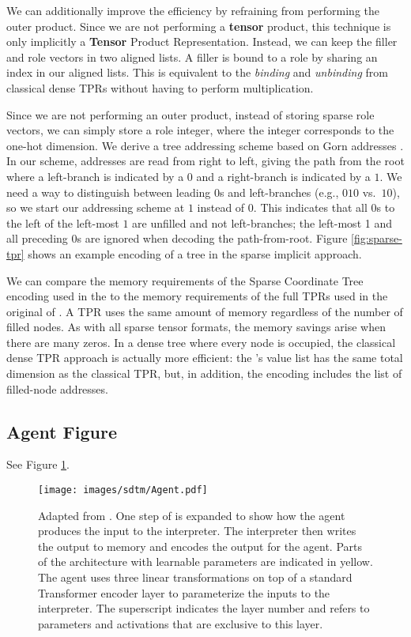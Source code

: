 We can additionally improve the efficiency by refraining from performing the outer product. Since we are not performing a \textbf{tensor} product, this technique is only implicitly a \textbf{Tensor} Product Representation. Instead, we can keep the filler and role vectors in two aligned lists. A filler is bound to a role by sharing an index in our aligned lists. This is equivalent to the \textit{binding} and \textit{unbinding} from classical dense TPRs without having to perform multiplication.

Since we are not performing an outer product, instead of storing sparse role vectors, we can simply store a role integer, where the integer corresponds to the one-hot dimension. We derive a tree addressing scheme based on Gorn addresses \citep{gorn+1967+77+115}. In our scheme, addresses are read from right to left, giving the path from the root where a left-branch is indicated by a $0$ and a right-branch is indicated by a $1$. We need a way to distinguish between leading $0$s and left-branches (e.g., $010$ vs.\ $10$), so we start our addressing scheme at $1$ instead of $0$. This indicates that all $0$s to the left of the left-most $1$ are unfilled and not left-branches; the left-most 1 and all preceding 0s are ignored when decoding the path-from-root. Figure \ref{fig:sparse-tpr} shows an example encoding of a tree in the sparse implicit approach.

We can compare the memory requirements of the Sparse Coordinate Tree encoding used in the \sdtm to the memory requirements of the full TPRs used in the original \dtm of \citet{Soulos_2023_DifferentiableTreeOperations}. A TPR uses the same amount of memory regardless of the number of filled nodes. As with all sparse tensor formats, the memory savings arise when there are many zeros. In a dense tree where every node is occupied, the classical dense TPR approach is actually more efficient: the \abvrepname's value list has the same total dimension as the classical TPR, but, in addition, the \abvrepname encoding includes the list of filled-node addresses.

\subsection{Agent Figure}
See Figure \ref{fig:agent}.
\begin{figure}
    \centering
    \texttt{[image: images/sdtm/Agent.pdf]}
    \caption{Adapted from \citet{Soulos_2023_DifferentiableTreeOperations}. One step of \dtm is expanded to show how the agent produces the input to the interpreter. The interpreter then writes the output to memory and encodes the output for the agent. Parts of the architecture with learnable parameters are indicated in yellow. The agent uses three linear transformations on top of a standard Transformer encoder layer to parameterize the inputs to the interpreter. The superscript indicates the layer number and refers to parameters and activations that are exclusive to this layer.}
    \label{fig:agent}
\end{figure}

